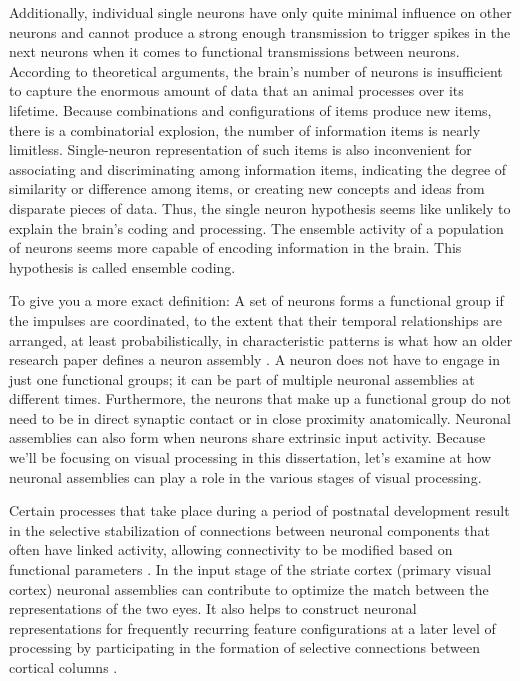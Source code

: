 \documentclass[12pt]{report}
\begin{document}
Additionally, individual single neurons have only quite minimal influence on other neurons and cannot produce a strong enough transmission to trigger spikes in the next neurons when it comes to functional transmissions between neurons. According to theoretical arguments, the brain's number of neurons is insufficient to capture the enormous amount of data that an animal processes over its lifetime. Because combinations and configurations of items produce new items, there is a combinatorial explosion, the number of information items is nearly limitless. Single-neuron representation of such items is also inconvenient for associating and discriminating among information items, indicating the degree of similarity or difference among items, or creating new concepts and ideas from disparate pieces of data. Thus, the single neuron hypothesis seems like unlikely to explain the brain's coding and processing. The ensemble activity of a population of neurons seems more capable of encoding information in the brain. This hypothesis is called ensemble coding.

To give you a more exact definition: A set of neurons forms a functional group if the impulses are coordinated, to the extent that their temporal relationships are arranged, at least probabilistically, in characteristic patterns is what how an older research paper defines a neuron assembly \cite{gerstein1978} . A neuron does not have to engage in just one functional groups; it can be part of multiple neuronal assemblies at different times. Furthermore, the neurons that make up a functional group do not need to be in direct synaptic contact or in close proximity anatomically. Neuronal assemblies can also form when neurons share extrinsic input activity. Because we'll be focusing on visual processing in this dissertation, let's examine at how neuronal assemblies can play a role in the various stages of visual processing.

Certain processes that take place during a period of postnatal development result in the selective stabilization of connections between neuronal components that often have linked activity, allowing connectivity to be modified based on functional parameters \cite{singer1990}. In the input stage of the striate cortex (primary visual cortex) neuronal assemblies can contribute to optimize the match between the representations of the two eyes. It also helps to construct neuronal representations for frequently recurring feature configurations at a later level of processing by participating in the formation of selective connections between cortical columns .
\end{document}

